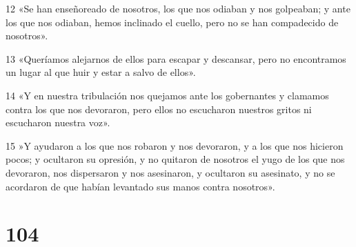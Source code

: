\par 12 «Se han enseñoreado de nosotros, los que nos odiaban y nos golpeaban; y ante los que nos odiaban, hemos inclinado el cuello, pero no se han compadecido de nosotros».
\par 13 «Queríamos alejarnos de ellos para escapar y descansar, pero no encontramos un lugar al que huir y estar a salvo de ellos».
\par 14 «Y en nuestra tribulación nos quejamos ante los gobernantes y clamamos contra los que nos devoraron, pero ellos no escucharon nuestros gritos ni escucharon nuestra voz».
\par 15 »Y ayudaron a los que nos robaron y nos devoraron, y a los que nos hicieron pocos; y ocultaron su opresión, y no quitaron de nosotros el yugo de los que nos devoraron, nos dispersaron y nos asesinaron, y ocultaron su asesinato, y no se acordaron de que habían levantado sus manos contra nosotros».

\chapter{104}

